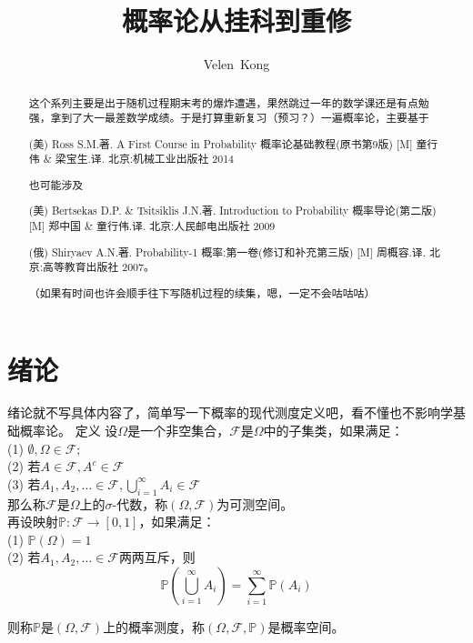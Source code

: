 \documentclass[UTF8]{ctexart}
\begin{document}
\pagestyle{headings}
\title{概率论从挂科到重修}
\author{Velen~Kong
}
\maketitle
\begin{abstract}
这个系列主要是出于随机过程期末考的爆炸遭遇，果然跳过一年的数学课还是有点勉强，拿到了大一最差数学成绩。于是打算重新复习（预习？）一遍概率论，主要基于

(美) Ross S.M.著. A First Course in Probability 概率论基础教程(原书第9版) [M] 童行伟 \& 梁宝生.译. 北京:机械工业出版社 2014

也可能涉及

(美) Bertsekas D.P. \& Tsitsiklis J.N.著. Introduction to Probability 概率导论(第二版) [M] 郑中国 \& 童行伟.译. 北京:人民邮电出版社 2009

(俄) Shiryaev A.N.著. Probability-1 概率:第一卷(修订和补充第三版) [M] 周概容.译. 北京:高等教育出版社 2007。

（如果有时间也许会顺手往下写随机过程的续集，嗯，一定不会咕咕咕）\\
\end{abstract}

\section{绪论}
绪论就不写具体内容了，简单写一下概率的现代测度定义吧，看不懂也不影响学基础概率论。
定义 设$\Omega $是一个非空集合，$\mathcal{F}$是$\Omega $中的子集类，如果满足：\\
(1) $\emptyset ,\Omega \in \mathcal{F};$\\
(2) 若$A\in \mathcal{F},A^{c}\in \mathcal{F}$\\
(3) 若$A_{1},A_{2},\ldots \in \mathcal{F},\bigcup_{i=1}^{\infty}A_{i}\in \mathcal{F}$\\

那么称$\mathcal{F}$是$\Omega$上的$\sigma$-代数，称$(\Omega ,\mathcal{F})$为可测空间。\\

再设映射$\mathbb{P}:\mathcal{F}\to [0,1]$，如果满足：\\
(1) $\mathbb{P}(\Omega )=1$\\
(2) 若$A_{1},A_{2},\ldots \in \mathcal{F}$两两互斥，则$$\mathbb{P}(\bigcup_{i=1}^{\infty}A_{i}) = \sum_{i=1}^{\infty}\mathbb{P}(A_{i})$$

则称$\mathbb{P}$是$(\Omega ,\mathcal{F})$上的概率测度，称$(\Omega ,\mathcal{F},\mathbb{P})$是概率空间。\\
\end{document}
